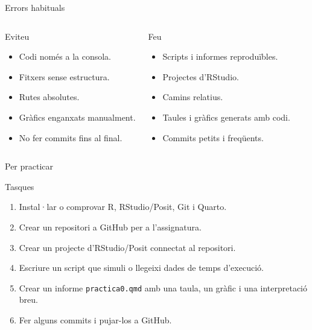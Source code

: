 \documentclass[10pt,aspectratio=169]{beamer}
\newcommand{\R}{\textsf{R}}
\newcommand{\RStudio}{\textsf{RStudio/Posit}}
\newcommand{\GitHub}{\textsf{GitHub}}
\newcommand{\Quarto}{\textsf{Quarto}}
\newcommand{\Git}{\textsf{Git}}
\begin{document}
\begin{frame}{Errors habituals}
\begin{columns}[T]
\begin{alertblock}{Eviteu}
\begin{itemize}
  \item Codi només a la consola.
  \item Fitxers sense estructura.
  \item Rutes absolutes.
  \item Gràfics enganxats manualment.
  \item No fer commits fins al final.
\end{itemize}
\end{alertblock}

\begin{block}{Feu}
\begin{itemize}
  \item Scripts i informes reproduïbles.
  \item Projectes d'RStudio.
  \item Camins relatius.
  \item Taules i gràfics generats amb codi.
  \item Commits petits i freqüents.
\end{itemize}
\end{block}
\end{columns}
\end{frame}

\begin{frame}{Per practicar}
\begin{block}{Tasques}
\begin{enumerate}
  \item Instal·lar o comprovar \R, \RStudio{}, \Git{} i \Quarto.
  \item Crear un repositori a \GitHub{} per a l'assignatura.
  \item Crear un projecte d'\RStudio{} connectat al repositori.
  \item Escriure un script que simuli o llegeixi dades de temps d'execució.
  \item Crear un informe \texttt{practica0.qmd} amb una taula, un gràfic i una interpretació breu.
  \item Fer alguns commits i pujar-los a \GitHub{}.
\end{enumerate}
\end{block}
\end{frame}
\end{document}
